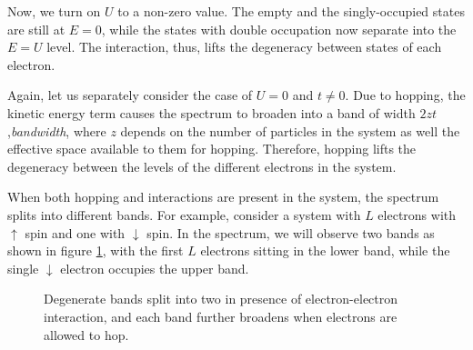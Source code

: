\documentclass[]{report}
\begin{document}
Now, we turn on $ U $ to a non-zero value. The empty and the singly-occupied states are still at $ E = 0 $, while the states with double occupation now separate into the $ E = U $ level. The interaction, thus, lifts the degeneracy between states of each electron.

Again, let us separately consider the case of $ U = 0 $ and $ t \ne 0 $. Due to hopping, the kinetic energy term causes the spectrum to broaden into a band of width $ 2zt $,\textit{bandwidth}, where $ z $ depends on the number of particles in the system as well the effective space available to them for hopping. Therefore, hopping lifts the degeneracy between the levels of the different electrons in the system.

When both hopping and interactions are present in the system, the spectrum splits into different bands. For example, consider a system with $ L $ electrons with $ \uparrow $ spin and one with $ \downarrow $ spin. In the spectrum, we will observe two bands as shown in figure \ref{fig:splitting}, with the first $ L $ electrons sitting in the lower band, while the single $ \downarrow $ electron occupies the upper band.
\begin{figure}[h!]
	\centering
	\caption{Degenerate bands split into two in presence of electron-electron interaction, and each band further broadens when electrons are allowed to hop.}\label{fig:splitting}
\end{figure}
\end{document}
